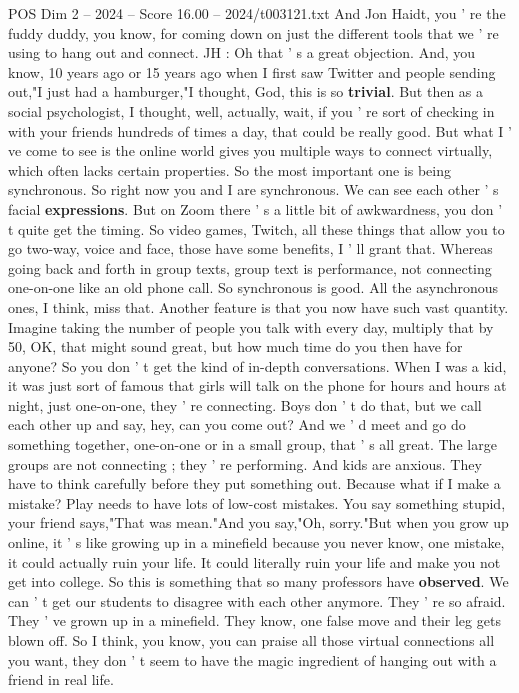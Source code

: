 \begin{textsample}{POS Dim 2 – 2024 – Score 16.00 – 2024/t003121.txt}
And Jon Haidt, you ' re the fuddy duddy, you know, for coming down on just the different tools that we ' re using to hang out and connect.
JH : Oh that ' s a great objection.
And, you know, 10 years ago or 15 years ago when I first saw Twitter and people sending out,"I just had a hamburger,"I thought, God, this is so \textbf{trivial}.
But then as a social psychologist, I thought, well, actually, wait, if you ' re sort of checking in with your friends hundreds of times a day, that could be really good.
But what I ' ve come to see is the online world gives you multiple ways to connect virtually, which often lacks certain properties.
So the most important one is being synchronous.
So right now you and I are synchronous.
We can see each other ' s facial \textbf{expressions}.
But on Zoom there ' s a little bit of awkwardness, you don ' t quite get the timing.
So video games, Twitch, all these things that allow you to go two-way, voice and face, those have some benefits, I ' ll grant that.
Whereas going back and forth in group texts, group text is performance, not connecting one-on-one like an old phone call.
So synchronous is good.
All the asynchronous ones, I think, miss that.
Another feature is that you now have such vast quantity.
Imagine taking the number of people you talk with every day, multiply that by 50, OK, that might sound great, but how much time do you then have for anyone?
So you don ' t get the kind of in-depth conversations.
When I was a kid, it was just sort of famous that girls will talk on the phone for hours and hours at night, just one-on-one, they ' re connecting.
Boys don ' t do that, but we call each other up and say, hey, can you come out?
And we ' d meet and go do something together, one-on-one or in a small group, that ' s all great.
The large groups are not connecting ; they ' re performing.
And kids are anxious.
They have to think carefully before they put something out.
Because what if I make a mistake?
Play needs to have lots of low-cost mistakes.
You say something stupid, your friend says,"That was mean."And you say,"Oh, sorry."But when you grow up online, it ' s like growing up in a minefield because you never know, one mistake, it could actually ruin your life.
It could literally ruin your life and make you not get into college.
So this is something that so many professors have \textbf{observed}.
We can ' t get our students to disagree with each other anymore.
They ' re so afraid.
They ' ve grown up in a minefield.
They know, one false move and their leg gets blown off.
So I think, you know, you can praise all those virtual connections all you want, they don ' t seem to have the magic ingredient of hanging out with a friend in real life.

\end{textsample}
